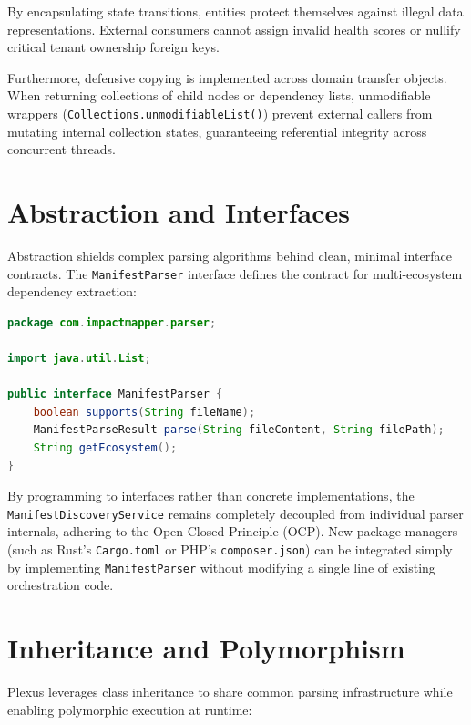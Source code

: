 \documentclass[11pt,a4paper,openany]{report}
\begin{document}
By encapsulating state transitions, entities protect themselves against illegal data representations. External consumers cannot assign invalid health scores or nullify critical tenant ownership foreign keys.

Furthermore, defensive copying is implemented across domain transfer objects. When returning collections of child nodes or dependency lists, unmodifiable wrappers (\texttt{Collections.unmodifiableList()}) prevent external callers from mutating internal collection states, guaranteeing referential integrity across concurrent threads.

\section{Abstraction and Interfaces}
Abstraction shields complex parsing algorithms behind clean, minimal interface contracts. The \texttt{ManifestParser} interface defines the contract for multi-ecosystem dependency extraction:

\begin{lstlisting}[language=Java, caption={Abstraction via the ManifestParser Interface}]
package com.impactmapper.parser;

import java.util.List;

public interface ManifestParser {
    boolean supports(String fileName);
    ManifestParseResult parse(String fileContent, String filePath);
    String getEcosystem();
}
\end{lstlisting}

By programming to interfaces rather than concrete implementations, the \texttt{ManifestDiscoveryService} remains completely decoupled from individual parser internals, adhering to the Open-Closed Principle (OCP). New package managers (such as Rust's \texttt{Cargo.toml} or PHP's \texttt{composer.json}) can be integrated simply by implementing \texttt{ManifestParser} without modifying a single line of existing orchestration code.

\section{Inheritance and Polymorphism}
Plexus leverages class inheritance to share common parsing infrastructure while enabling polymorphic execution at runtime:
\end{document}
